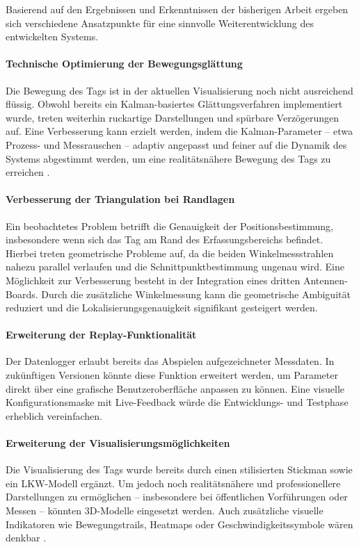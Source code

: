 \documentclass[a4paper, 12pt]{article} %
\begin{document}
Basierend auf den Ergebnissen und Erkenntnissen der bisherigen Arbeit ergeben sich verschiedene Ansatzpunkte für eine sinnvolle Weiterentwicklung
des entwickelten Systems.

\paragraph{Technische Optimierung der Bewegungsglättung}
Die Bewegung des Tags ist in der aktuellen Visualisierung noch nicht ausreichend flüssig. Obwohl bereits ein Kalman-basiertes Glättungsverfahren 
implementiert wurde, treten weiterhin ruckartige Darstellungen und spürbare Verzögerungen auf. Eine Verbesserung kann erzielt werden, indem die 
Kalman-Parameter – etwa Prozess- und Messrauschen – adaptiv angepasst und feiner auf die Dynamik des Systems abgestimmt werden, um eine realitätsnähere
 Bewegung des Tags zu erreichen \cite{kalman_filter_book}.

\paragraph{Verbesserung der Triangulation bei Randlagen}
Ein beobachtetes Problem betrifft die Genauigkeit der Positionsbestimmung, insbesondere wenn sich das Tag am Rand des Erfassungsbereichs befindet. 
Hierbei treten geometrische Probleme auf, da die beiden Winkelmessstrahlen nahezu parallel verlaufen und die Schnittpunktbestimmung ungenau wird. 
Eine Möglichkeit zur Verbesserung besteht in der Integration eines dritten Antennen-Boards. Durch die zusätzliche Winkelmessung kann die geometrische 
Ambiguität reduziert und die Lokalisierungsgenauigkeit signifikant gesteigert werden.

\paragraph{Erweiterung der Replay-Funktionalität}
Der Datenlogger erlaubt bereits das Abspielen aufgezeichneter Messdaten. In zukünftigen Versionen könnte diese Funktion erweitert werden, um Parameter 
direkt über eine grafische Benutzeroberfläche anpassen zu können. Eine visuelle Konfigurationsmaske mit Live-Feedback würde die Entwicklungs- und 
Testphase erheblich vereinfachen.

\paragraph{Erweiterung der Visualisierungsmöglichkeiten}
Die Visualisierung des Tags wurde bereits durch einen stilisierten Stickman sowie ein \ac{LKW}-Modell ergänzt. Um jedoch noch realitätsnähere und
professionellere Darstellungen zu ermöglichen – insbesondere bei öffentlichen Vorführungen oder Messen – könnten 3D-Modelle eingesetzt werden. 
Auch zusätzliche visuelle Indikatoren wie Bewegungstrails, Heatmaps oder Geschwindigkeitssymbole wären denkbar \cite{webgl_book}.
\end{document}
